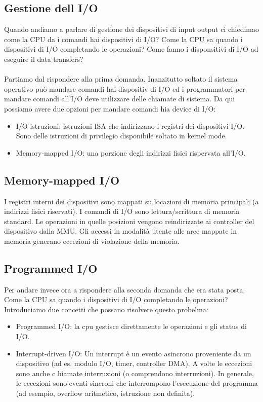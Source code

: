 \subsection{Gestione dell I/O}
Quando andiamo a parlare di gestione dei dispositivi di input output ci chiedimao come la CPU da i comandi 
hai dispositivi di I/O? Come la CPU sa quando i dispositivi di I/O completando le operazioni? Come fanno i 
disponsitivi di I/O ad eseguire il data transfers?\\\\
Partiamo dal rispondere alla prima domanda. Inanzitutto soltato il sistema operativo può mandare comandi hai dispositiv
di I/O ed i programmatori per mandare comandi all'I/O deve utilizzare delle chiamate di sistema. Da qui possiamo avere
due opzioni per mandare comandi hia device di I/O:
\begin{itemize}
    \item I/O istruzioni: istruzioni ISA che indirizzano i registri dei dispositivi I/O. Sono delle istruzioni di privilegio disponibile soltato in kernel mode.
    \item Memory-mapped I/O: una porzione degli indirizzi fisici rispervata all'I/O.
\end{itemize}

\hspace{-15pt}

\subsection{Memory-mapped I/O}
I registri interni dei dispositivi sono mappati su locazioni di memoria principali (a indirizzi fisici riservati). 
I comandi di I/O sono lettura/scrittura di memoria standard. Le operazioni in quelle posizioni vengono reindirizzate ai controller del dispositivo dalla MMU. 
Gli accessi in modalità utente alle aree mappate in memoria generano eccezioni di violazione della memoria.

\subsection{Programmed I/O}
Per andare invece ora a rispondere alla seconda domanda che era stata posta. Come la CPU sa quando i dispositivi di I/O completando le operazioni?
Introduciamo due concetti che possano risolvere questo probelma:
\begin{itemize}
    \item Programmed I/O: la cpu gestisce direttamente le operazioni e gli status di I/O.
    \item Interrupt-driven I/O: Un interrupt è un evento asincrono proveniente da un dispositivo (ad es. modulo I/O, timer, controller DMA). A volte le eccezioni sono anche c
    hiamate interruzioni (o comprendono interruzioni). In generale, le eccezioni sono eventi sincroni che interrompono l'esecuzione del programma (ad esempio, overflow aritmetico, istruzione non definita).
\end{itemize}

